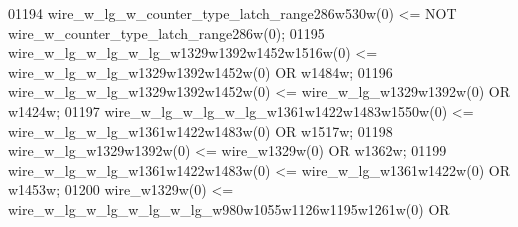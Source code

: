 \begin{DoxyCode}
{01194     \textcolor{vhdlchar}{wire_w_lg_w_counter_type_latch_range286w530w}\textcolor{vhdlchar}{(}\textcolor{vhdllogic}{}\textcolor{vhdllogic}{0}\textcolor{vhdlchar}{)} \textcolor{vhdlchar}{<=} \textcolor{keywordflow}{NOT} \textcolor{vhdlchar}{
      wire_w_counter_type_latch_range286w}\textcolor{vhdlchar}{(}\textcolor{vhdllogic}{}\textcolor{vhdllogic}{0}\textcolor{vhdlchar}{)};
01195     \textcolor{vhdlchar}{wire_w_lg_w_lg_w_lg_w1329w1392w1452w1516w}\textcolor{vhdlchar}{(}\textcolor{vhdllogic}{}\textcolor{vhdllogic}{0}\textcolor{vhdlchar}{)} \textcolor{vhdlchar}{<=} \textcolor{vhdlchar}{
      wire_w_lg_w_lg_w1329w1392w1452w}\textcolor{vhdlchar}{(}\textcolor{vhdllogic}{}\textcolor{vhdllogic}{0}\textcolor{vhdlchar}{)} \textcolor{keywordflow}{OR} \textcolor{vhdlchar}{w1484w};
01196     \textcolor{vhdlchar}{wire_w_lg_w_lg_w1329w1392w1452w}\textcolor{vhdlchar}{(}\textcolor{vhdllogic}{}\textcolor{vhdllogic}{0}\textcolor{vhdlchar}{)} \textcolor{vhdlchar}{<=} \textcolor{vhdlchar}{wire_w_lg_w1329w1392w}\textcolor{vhdlchar}{(}\textcolor{vhdllogic}{}\textcolor{vhdllogic}{0}\textcolor{vhdlchar}{)} \textcolor{keywordflow}{OR} \textcolor{vhdlchar}{w1424w};
01197     \textcolor{vhdlchar}{wire_w_lg_w_lg_w_lg_w1361w1422w1483w1550w}\textcolor{vhdlchar}{(}\textcolor{vhdllogic}{}\textcolor{vhdllogic}{0}\textcolor{vhdlchar}{)} \textcolor{vhdlchar}{<=} \textcolor{vhdlchar}{
      wire_w_lg_w_lg_w1361w1422w1483w}\textcolor{vhdlchar}{(}\textcolor{vhdllogic}{}\textcolor{vhdllogic}{0}\textcolor{vhdlchar}{)} \textcolor{keywordflow}{OR} \textcolor{vhdlchar}{w1517w};
01198     \textcolor{vhdlchar}{wire_w_lg_w1329w1392w}\textcolor{vhdlchar}{(}\textcolor{vhdllogic}{}\textcolor{vhdllogic}{0}\textcolor{vhdlchar}{)} \textcolor{vhdlchar}{<=} \textcolor{vhdlchar}{wire_w1329w}\textcolor{vhdlchar}{(}\textcolor{vhdllogic}{}\textcolor{vhdllogic}{0}\textcolor{vhdlchar}{)} \textcolor{keywordflow}{OR} \textcolor{vhdlchar}{w1362w};
01199     \textcolor{vhdlchar}{wire_w_lg_w_lg_w1361w1422w1483w}\textcolor{vhdlchar}{(}\textcolor{vhdllogic}{}\textcolor{vhdllogic}{0}\textcolor{vhdlchar}{)} \textcolor{vhdlchar}{<=} \textcolor{vhdlchar}{wire_w_lg_w1361w1422w}\textcolor{vhdlchar}{(}\textcolor{vhdllogic}{}\textcolor{vhdllogic}{0}\textcolor{vhdlchar}{)} \textcolor{keywordflow}{OR} \textcolor{vhdlchar}{w1453w};
01200     \textcolor{vhdlchar}{wire_w1329w}\textcolor{vhdlchar}{(}\textcolor{vhdllogic}{}\textcolor{vhdllogic}{0}\textcolor{vhdlchar}{)} \textcolor{vhdlchar}{<=} \textcolor{vhdlchar}{wire_w_lg_w_lg_w_lg_w_lg_w980w1055w1126w1195w1261w}\textcolor{vhdlchar}{(}\textcolor{vhdllogic}{}\textcolor{vhdllogic}{0}\textcolor{vhdlchar}{)} \textcolor{keywordflow}{OR} \textcolor{vhdlchar}{
}}
\end{DoxyCode}
